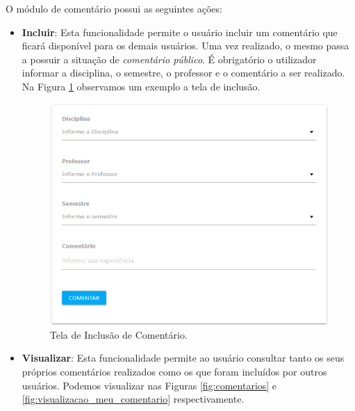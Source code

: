\documentclass[12pt, a4paper]{report}
\begin{document}
O módulo de comentário possui as seguintes ações:

\begin{itemize}
\item \textbf{Incluir}: Esta funcionalidade permite o usuário incluir um comentário que ficará disponível para os demais usuários. Uma vez realizado, o mesmo passa a possuir a situação de \textit{comentário público}. É obrigatório o utilizador informar a disciplina, o semestre, o professor e o comentário a ser realizado. Na Figura \ref{fig:incluir_comentario} observamos um exemplo a tela de inclusão.

\begin{figure}
\centering
\includegraphics[scale=0.59]{incluir_comentario2.png}
\caption{Tela de Inclusão de Comentário.}
\label{fig:incluir_comentario}
\end{figure}

\item \textbf{Visualizar}: Esta funcionalidade permite ao usuário consultar tanto os seus próprios comentários realizados como os que foram incluídos por outros usuários. Podemos visualizar nas Figuras \ref{fig:comentarios} e \ref{fig:visualizacao_meu_comentario} respectivamente.


\end{itemize}
\end{document}
